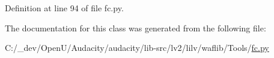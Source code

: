 Definition at line 94 of file fc.\+py.



The documentation for this class was generated from the following file\+:\begin{DoxyCompactItemize}
\item 
C\+:/\+\_\+dev/\+Open\+U/\+Audacity/audacity/lib-\/src/lv2/lilv/waflib/\+Tools/\hyperlink{lilv_2waflib_2_tools_2fc_8py}{fc.\+py}\end{DoxyCompactItemize}
